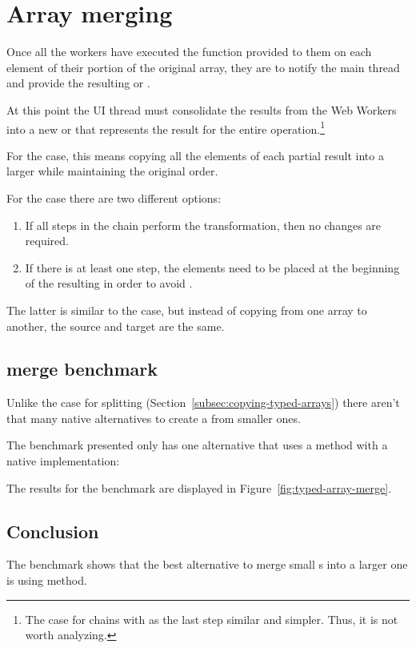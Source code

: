 \section{Array merging}

Once all the workers have executed the function provided to them on each element of their portion of the original array, they are to notify the main thread and provide the resulting \tabuffer{} or \tsabuffer{}.

At this point the UI thread must consolidate the results from the Web Workers into a new \ttarray{} or \tstarray{} that represents the result for the entire operation.\footnote{The case for chains with  as the last step similar and simpler. Thus, it is not worth analyzing.}

For the \tabuffer{} case, this means copying all the elements of each partial result into a larger \ttarray{} while maintaining the original order.

For the \tsabuffer{} case there are two different options:
\begin{enumerate}
  \item If all steps in the chain perform the  transformation, then no changes are required.
  \item If there is at least one  step, the elements need to be placed at the beginning of the resulting \tstarray{} in order to avoid .
\end{enumerate}

The latter is similar to the \tabuffer{} case, but instead of copying from one array to another, the source and target are the same.

\subsection{\ttarray{} merge benchmark}
Unlike the case for \ttarray{} splitting (Section~\ref{subsec:copying-typed-arrays}) there aren't that many native alternatives to create a \ttarray{} from smaller ones.

The benchmark presented only has one alternative that uses a method with a native implementation:

The results for the benchmark are displayed in Figure~\ref{fig:typed-array-merge}.

\subsection{Conclusion}
The benchmark shows that the best alternative to merge small \ttarray{}s into a larger one is using  method.

